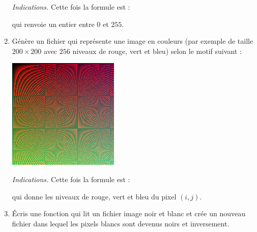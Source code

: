\documentclass[11pt,class=report,crop=false]{standalone}
\begin{document}
\begin{activite}
\begin{enumerate}
\emph{Indications.} Cette fois la formule est :

\centerline{}

qui renvoie un entier entre $0$ et $255$.

   \item Génère un fichier  qui représente une image en couleurs (par exemple de taille $200 \times 200$ avec $256$ niveaux de rouge, vert et bleu) selon le motif suivant :
\begin{center}
\includegraphics[scale=\myscale,scale=0.7]{ecran-image_coul}
\end{center}   

\emph{Indications.} Cette fois la formule est :

\centerline{}

\centerline{}

\centerline{}

qui donne les niveaux de rouge, vert et bleu du pixel $(i,j)$.

\item Écris une fonction  qui lit un fichier image noir et blanc  et crée un nouveau fichier dans lequel les pixels blancs sont devenus noirs et inversement. 


\end{enumerate}
\end{activite}
\end{document}

